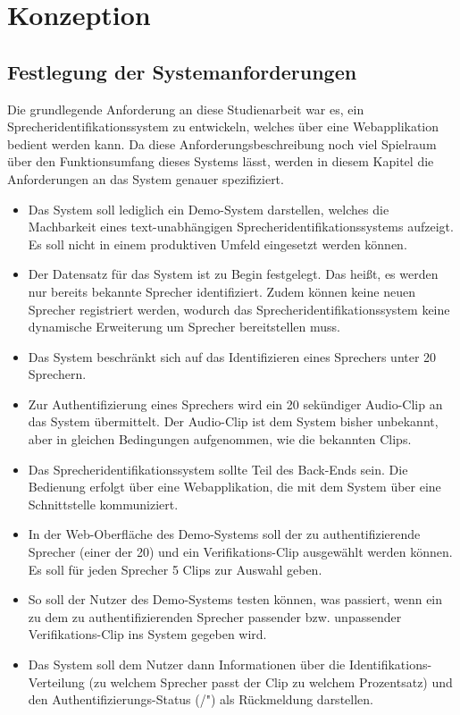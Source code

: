 \section{Konzeption}

\subsection{Festlegung der Systemanforderungen}

Die grundlegende Anforderung an diese Studienarbeit war es, ein Sprecheridentifikationssystem zu entwickeln, welches über eine Webapplikation bedient werden kann.
Da diese Anforderungsbeschreibung noch viel Spielraum über den Funktionsumfang dieses Systems lässt, werden in diesem Kapitel die Anforderungen an das System genauer spezifiziert.


\begin{itemize}
    \item Das System soll lediglich ein Demo-System darstellen, welches die Machbarkeit eines text-unabhängigen Sprecheridentifikationssystems aufzeigt. Es soll nicht in einem produktiven Umfeld eingesetzt werden können.
    \item Der Datensatz für das System ist zu Begin festgelegt. Das heißt, es werden nur bereits bekannte Sprecher identifiziert. Zudem können keine neuen Sprecher registriert werden, wodurch das Sprecheridentifikationssystem keine dynamische Erweiterung um Sprecher bereitstellen muss.
    \item Das System beschränkt sich auf das Identifizieren eines Sprechers unter 20 Sprechern.
    \item Zur Authentifizierung eines Sprechers wird ein 20 sekündiger Audio-Clip an das System übermittelt. Der Audio-Clip ist dem System bisher unbekannt, aber in gleichen Bedingungen aufgenommen, wie die bekannten Clips.
    \item Das Sprecheridentifikationssystem sollte Teil des Back-Ends sein. Die Bedienung erfolgt über eine Webapplikation, die mit dem System über eine Schnittstelle kommuniziert.
    \item In der Web-Oberfläche des Demo-Systems soll der zu authentifizierende Sprecher (einer der 20) und ein Verifikations-Clip ausgewählt werden können. Es soll für jeden Sprecher 5 Clips zur Auswahl geben.
    \item So soll der Nutzer des Demo-Systems testen können, was passiert, wenn ein zu dem zu authentifizierenden Sprecher passender bzw. unpassender Verifikations-Clip ins System gegeben wird.
    \item Das System soll dem Nutzer dann Informationen über die Identifikations-Verteilung (zu welchem Sprecher passt der Clip zu welchem Prozentsatz) und den Authentifizierungs-Status (/") als Rückmeldung darstellen.
\end{itemize}


